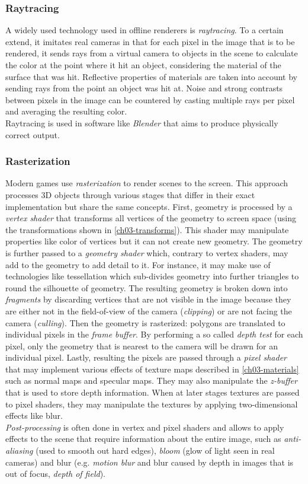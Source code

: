 \subsubsection{Raytracing}
A widely used technology used in offline renderers is \emph{raytracing}. To a certain extend, it imitates real cameras in that for each pixel in the image that is to be rendered, it sends rays from a virtual camera to objects in the scene to calculate the color at the point where it hit an object, considering the material of the surface that was hit. Reflective properties of materials are taken into account by sending rays from the point an object was hit at. Noise and strong contrasts between pixels in the image can be countered by casting multiple rays per pixel and averaging the resulting color.\\
Raytracing is used in software like \emph{Blender} that aims to produce physically correct output.

\subsubsection{Rasterization} Modern games use \emph{rasterization} to render scenes to the screen. This approach processes 3D objects through various stages that differ in their exact implementation but share the same concepts. First, geometry is processed by a \emph{vertex shader} that transforms all vertices of the geometry to screen space (using the transformations shown in \ref{ch03-transforms}). This shader may manipulate properties like color of vertices but it can not create new geometry. The geometry is further passed to a \emph{geometry shader} which, contrary to vertex shaders, may add to the geometry to add detail to it. For instance, it may make use of technologies like tessellation which sub-divides geometry into further triangles to round the silhouette of geometry. The resulting geometry is broken down into \emph{fragments} by discarding vertices that are not visible in the image because they are either not in the field-of-view of the camera (\emph{clipping}) or are not facing the camera (\emph{culling}).
Then the geometry is rasterized: polygons are translated to individual pixels in the \emph{frame buffer}. By performing a so called \emph{depth test} for each pixel, only the geometry that is nearest to the camera will be drawn for an individual pixel.
Lastly, resulting the pixels are passed through a \emph{pixel shader} that may implement various effects of texture maps described in \ref{ch03-materials} such as normal maps and specular maps. They may also manipulate the \emph{z-buffer} that is used to store depth information. When at later stages textures are passed to pixel shaders, they may manipulate the textures by applying two-dimensional effects like blur.\\
\emph{Post-processing} is often done in vertex and pixel shaders and allows to apply effects to the scene that require information about the entire image, such as \emph{anti-aliasing} (used to smooth out hard edges), \emph{bloom} (glow of light seen in real cameras) and blur (e.g. \emph{motion blur} and blur caused by depth in images that is out of focus, \emph{depth of field}).
\clearpage

